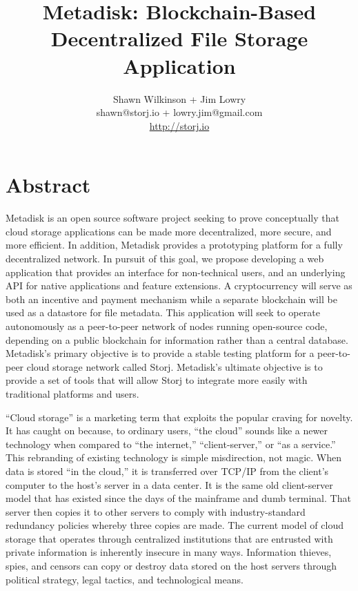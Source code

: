 \documentclass[a4paper,10pt]{article}
\begin{document}
\lstset{basicstyle=\ttfamily\footnotesize,breaklines=true}
\lstset{numbers=left, numberstyle=\tiny, stepnumber=1, numbersep=5pt}
\lstset{language=TeX}


\title{\large \bf Metadisk:  Blockchain-Based Decentralized File Storage Application}
\author{\small Shawn Wilkinson + Jim Lowry\\ \small shawn@storj.io + lowry.jim@gmail.com \\  \small \url{http://storj.io}}
\maketitle

\section*{Abstract}
Metadisk is an open source software project seeking to prove conceptually that cloud storage applications can be made more decentralized, more secure, and more efficient. In addition, Metadisk provides a prototyping platform for a fully decentralized network. In pursuit of this goal, we propose developing a web application that provides an interface for non-technical users, and an underlying API for native applications and feature extensions. A cryptocurrency will serve as both an incentive and payment mechanism while a separate blockchain will be used as a datastore for file metadata. This application will seek to operate autonomously as a peer-to-peer network of nodes running open-source code, depending on a public blockchain for information rather than a central database. Metadisk’s primary objective is to provide a stable testing platform for a peer-to-peer cloud storage network called Storj. Metadisk’s ultimate objective is to provide a set of tools that will allow Storj to integrate more easily with traditional platforms and users. 



“Cloud storage” is a marketing term that exploits the popular craving for novelty. It has caught on because, to ordinary users, “the cloud” sounds like a newer technology when compared to “the internet,” “client-server,” or “as a service.” This rebranding of existing technology is simple misdirection, not magic.  When data is stored “in the cloud,” it is transferred over TCP/IP from the client’s computer to the host’s server in a data center.  It is the same old client-server model that has existed since the days of the mainframe and dumb terminal. That server then copies it to other servers to comply with industry-standard redundancy policies whereby three copies are made. The current model of cloud storage that operates through centralized institutions that are entrusted with private information is inherently insecure in many ways.  Information thieves, spies, and censors can copy or destroy data stored on the host servers through political strategy, legal tactics, and technological means. \\
\end{document}

